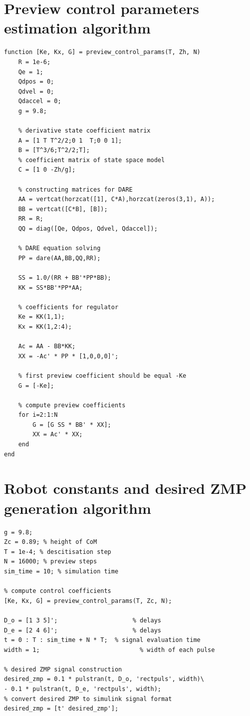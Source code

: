 \documentclass[12pt,a4paper]{report}
\begin{document}
	\begin{appendices}
		\chapter{Preview control parameters estimation algorithm}
			\begin{lstlisting}
function [Ke, Kx, G] = preview_control_params(T, Zh, N)
	R = 1e-6;
	Qe = 1;
	Qdpos = 0;
	Qdvel = 0;
	Qdaccel = 0;
	g = 9.8;
	
	% derivative state coefficient matrix
	A = [1 T T^2/2;0 1  T;0 0 1];
	B = [T^3/6;T^2/2;T];
	% coefficient matrix of state space model
	C = [1 0 -Zh/g];
	
	% constructing matrices for DARE
	AA = vertcat(horzcat([1], C*A),horzcat(zeros(3,1), A));
	BB = vertcat([C*B], [B]);
	RR = R;
	QQ = diag([Qe, Qdpos, Qdvel, Qdaccel]);
	
	% DARE equation solving
	PP = dare(AA,BB,QQ,RR);
	
	SS = 1.0/(RR + BB'*PP*BB);
	KK = SS*BB'*PP*AA;
	
	% coefficients for regulator
	Ke = KK(1,1);
	Kx = KK(1,2:4);
	
	Ac = AA - BB*KK;
	XX = -Ac' * PP * [1,0,0,0]';
	
	% first preview coefficient should be equal -Ke
	G = [-Ke];
	
	% compute preview coefficients
	for i=2:1:N
		G = [G SS * BB' * XX];
		XX = Ac' * XX;
	end
end
			\end{lstlisting}
		\chapter{Robot constants and desired ZMP generation algorithm}
			\begin{lstlisting}
g = 9.8;
Zc = 0.89; % height of CoM
T = 1e-4; % descitisation step
N = 16000; % preview steps
sim_time = 10; % simulation time

% compute control coefficients
[Ke, Kx, G] = preview_control_params(T, Zc, N);

D_o = [1 3 5]';                     % delays
D_e = [2 4 6]';                     % delays
t = 0 : T : sim_time + N * T;  % signal evaluation time
width = 1;                            % width of each pulse

% desired ZMP signal construction
desired_zmp = 0.1 * pulstran(t, D_o, 'rectpuls', width)\
- 0.1 * pulstran(t, D_e, 'rectpuls', width);
% convert desired ZMP to simulink signal format
desired_zmp = [t' desired_zmp'];
			\end{lstlisting}
	\end{appendices}
  
\end{document}

